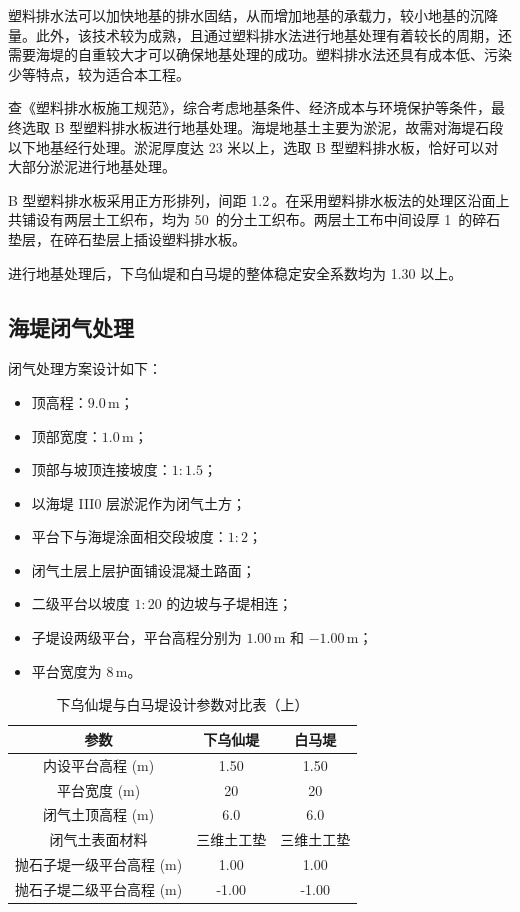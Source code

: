 \documentclass[UTF8, a4paper, 12pt]{ctexart} %
\begin{document}
塑料排水法可以加快地基的排水固结，从而增加地基的承载力，较小地基的沉降量。此外，该技术较为成熟，且通过塑料排水法进行地基处理有着较长的周期，还需要海堤的自重较大才可以确保地基处理的成功。塑料排水法还具有成本低、污染少等特点，较为适合本工程。

查《塑料排水板施工规范》，综合考虑地基条件、经济成本与环境保护等条件，最终选取 B 型塑料排水板进行地基处理。海堤地基土主要为淤泥，故需对海堤石段以下地基经行处理。淤泥厚度达 23 米以上，选取 B 型塑料排水板，恰好可以对大部分淤泥进行地基处理。

B 型塑料排水板采用正方形排列，间距 1.2\,。在采用塑料排水板法的处理区沿面上共铺设有两层土工织布，均为 50\, 的分土工织布。两层土工布中间设厚 1\, 的碎石垫层，在碎石垫层上插设塑料排水板。

进行地基处理后，下乌仙堤和白马堤的整体稳定安全系数均为 1.30 以上。

\subsection{海堤闭气处理}

闭气处理方案设计如下：
\begin{itemize}
    \item 顶高程：$9.0\,\text{m}$；
    \item 顶部宽度：$1.0\,\text{m}$；
    \item 顶部与坡顶连接坡度：$1:1.5$；
    \item 以海堤 III0 层淤泥作为闭气土方；
    \item 平台下与海堤涂面相交段坡度：$1:2$；
    \item 闭气土层上层护面铺设混凝土路面；
    \item 二级平台以坡度 $1:20$ 的边坡与子堤相连；
    \item 子堤设两级平台，平台高程分别为 $1.00\,\text{m}$ 和 $-1.00\,\text{m}$；
    \item 平台宽度为 $8\,\text{m}$。
\end{itemize}



\begin{table}[h]
    \centering
    \caption{下乌仙堤与白马堤设计参数对比表（上）}
    \begin{tabular}{|c|c|c|}
        \hline
        \textbf{参数} & \textbf{下乌仙堤} & \textbf{白马堤} \\ \hline
        内设平台高程 (m) & 1.50 & 1.50 \\ \hline
        平台宽度 (m) & 20 & 20 \\ \hline
        闭气土顶高程 (m) & 6.0 & 6.0 \\ \hline
        闭气土表面材料 & 三维土工垫 & 三维土工垫 \\ \hline
        抛石子堤一级平台高程 (m) & 1.00 & 1.00 \\ \hline
        抛石子堤二级平台高程 (m) & -1.00 & -1.00 \\ \hline
    \end{tabular}
    \label{tab:west_south_dike_comparison_part1}
\end{table}
\end{document}
